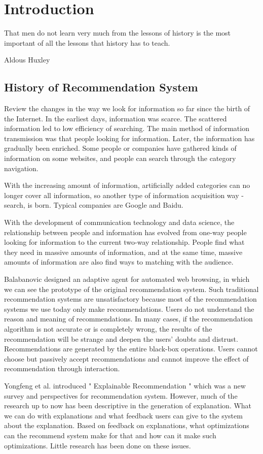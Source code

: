 \section{Introduction}
\label{ch:intro}

\epigraph{That men do not learn very much from the lessons of history is the most important of all the lessons that history has to teach.}{Aldous Huxley}

\subsection{History of Recommendation System}
Review the changes in the way we look for information so far since the birth of the Internet. In the earliest days, information was scarce. The scattered information led to low efficiency of searching. The main method of information transmission was that people looking for information. Later, the information has gradually been enriched. Some people or companies have gathered kinds of information on some websites, and people can search through the category navigation.
\par With the increasing amount of information, artificially added categories can no longer cover all information, so another type of information acquisition way - search, is born. Typical companies are Google and Baidu.
\par With the development of communication technology and data science, the relationship between people and information has evolved from one-way people looking for information to the current two-way relationship. People find what they need in massive amounts of information, and at the same time, massive amounts of information are also find ways to matching with the audience.
\par Balabanovic designed an adaptive agent for automated web browsing\cite{balabanovic1996adaptive}, in which we can see the prototype of the original recommendation system. Such traditional recommendation systems are unsatisfactory because most of the recommendation systems we use today only make recommendations. Users do not understand the reason and meaning of recommendations. In many cases, if the recommendation algorithm is not accurate or is completely wrong, the results of the recommendation will be strange and deepen the users' doubts and distrust. Recommendations are generated by the entire black-box operations. Users cannot choose but passively accept recommendations and cannot improve the effect of recommendation through interaction.
\par Yongfeng et al. introduced " Explainable Recommendation " which was a new survey and perspectives for recommendation system\cite{zhang2018explainable}. However, much of the research up to now has been descriptive in the generation of explanation. What we can do with explanations and what feedback users can give to the system about the explanation. Based on feedback on explanations, what optimizations can the recommend system make for that and how can it make such optimizations. Little research has been done on these issues.
